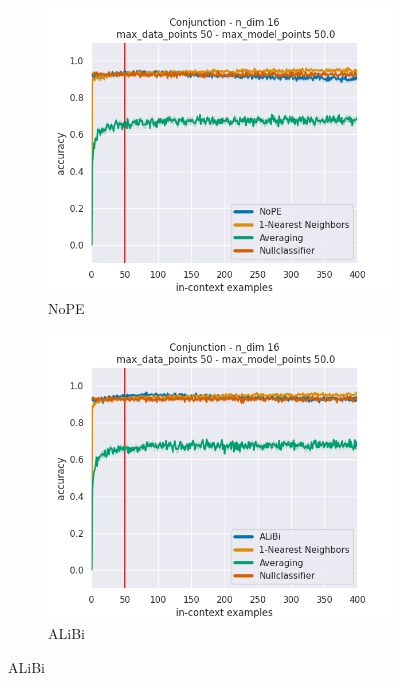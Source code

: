 \documentclass[letterpaper]{article} %
\begin{document}
\begin{figure}[tp]
    \centering
    \begin{subfigure}[t]{0.24\linewidth}
        \includegraphics[width=\linewidth]{AnonymousSubmission/LaTeX/imgs/experiments/conjunction/nope.png}
        \caption{NoPE}
    \end{subfigure}
    \begin{subfigure}[t]{0.24\linewidth}
        \includegraphics[width=\linewidth]{AnonymousSubmission/LaTeX/imgs/experiments/conjunction/alibi.png}
        \caption{ALiBi}

\end{subfigure}
\end{figure}
\end{document}
